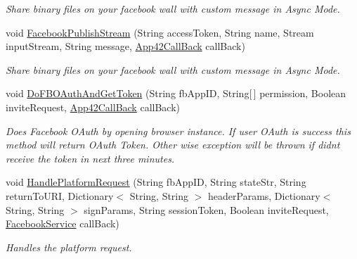 \begin{DoxyCompactItemize}
\begin{DoxyCompactList}\small\item\em Share binary files on your facebook wall with custom message in Async Mode. \end{DoxyCompactList}\item 
void \hyperlink{classcom_1_1shephertz_1_1app42_1_1paas_1_1sdk_1_1csharp_1_1social_1_1_social_service_ab545a846e7a988194200f7dab401ce0a}{Facebook\+Publish\+Stream} (String access\+Token, String name, Stream input\+Stream, String message, \hyperlink{interfacecom_1_1shephertz_1_1app42_1_1paas_1_1sdk_1_1csharp_1_1_app42_call_back}{App42\+Call\+Back} call\+Back)
\begin{DoxyCompactList}\small\item\em Share binary files on your facebook wall with custom message in Async Mode. \end{DoxyCompactList}\item 
void \hyperlink{classcom_1_1shephertz_1_1app42_1_1paas_1_1sdk_1_1csharp_1_1social_1_1_social_service_a8885531fe9babe1960e31a1ccab6be51}{Do\+F\+B\+O\+Auth\+And\+Get\+Token} (String fb\+App\+I\+D, String\mbox{[}$\,$\mbox{]} permission, Boolean invite\+Request, \hyperlink{interfacecom_1_1shephertz_1_1app42_1_1paas_1_1sdk_1_1csharp_1_1_app42_call_back}{App42\+Call\+Back} call\+Back)
\begin{DoxyCompactList}\small\item\em Does Facebook O\+Auth by opening browser instance. If user O\+Auth is success this method will return O\+Auth Token. Other wise exception will be thrown if didnt receive the token in next three minutes. \end{DoxyCompactList}\item 
void \hyperlink{classcom_1_1shephertz_1_1app42_1_1paas_1_1sdk_1_1csharp_1_1social_1_1_social_service_a8387b316b00ff23989cf0d32a533fe92}{Handle\+Platform\+Request} (String fb\+App\+I\+D, String state\+Str, String return\+To\+U\+R\+I, Dictionary$<$ String, String $>$ header\+Params, Dictionary$<$ String, String $>$ sign\+Params, String session\+Token, Boolean invite\+Request, \hyperlink{classcom_1_1shephertz_1_1app42_1_1paas_1_1sdk_1_1csharp_1_1social_1_1_facebook_service}{Facebook\+Service} call\+Back)
\begin{DoxyCompactList}\small\item\em Handles the platform request. \end{DoxyCompactList}\end{DoxyCompactItemize}
